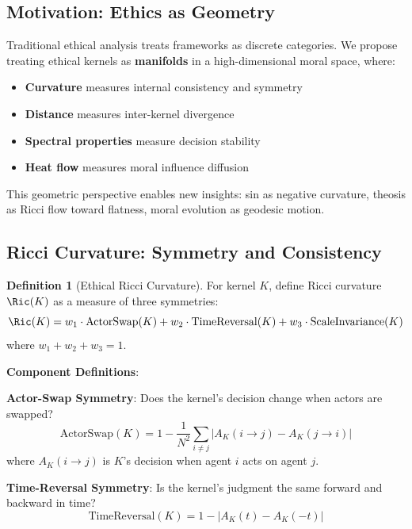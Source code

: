 \documentclass[11pt,a4paper]{article}
\theoremstyle{definition}
\newtheorem{definition}[theorem]{Definition}
\theoremstyle{remark}
\begin{document}
\subsection{Motivation: Ethics as Geometry}

Traditional ethical analysis treats frameworks as discrete categories. We propose treating ethical kernels as \textbf{manifolds} in a high-dimensional moral space, where:
\begin{itemize}
    \item \textbf{Curvature} measures internal consistency and symmetry
    \item \textbf{Distance} measures inter-kernel divergence
    \item \textbf{Spectral properties} measure decision stability
    \item \textbf{Heat flow} measures moral influence diffusion
\end{itemize}

This geometric perspective enables new insights: sin as negative curvature, theosis as Ricci flow toward flatness, moral evolution as geodesic motion.

\subsection{Ricci Curvature: Symmetry and Consistency}

\begin{definition}[Ethical Ricci Curvature]
\label{def:ricci}
For kernel $K$, define Ricci curvature $\Ric(K)$ as a measure of three symmetries:
\begin{equation}
    \Ric(K) = w_1 \cdot \text{ActorSwap}(K) + w_2 \cdot \text{TimeReversal}(K) + w_3 \cdot \text{ScaleInvariance}(K)
    \label{eq:ricci}
\end{equation}
where $w_1 + w_2 + w_3 = 1$.
\end{definition}

\textbf{Component Definitions}:

\textbf{Actor-Swap Symmetry}: Does the kernel's decision change when actors are swapped?
\begin{equation}
    \text{ActorSwap}(K) = 1 - \frac{1}{N^2} \sum_{i \neq j} |A_K(i \to j) - A_K(j \to i)|
\end{equation}
where $A_K(i \to j)$ is $K$'s decision when agent $i$ acts on agent $j$.

\textbf{Time-Reversal Symmetry}: Is the kernel's judgment the same forward and backward in time?
\begin{equation}
    \text{TimeReversal}(K) = 1 - |A_K(t) - A_K(-t)|
\end{equation}
\end{document}

